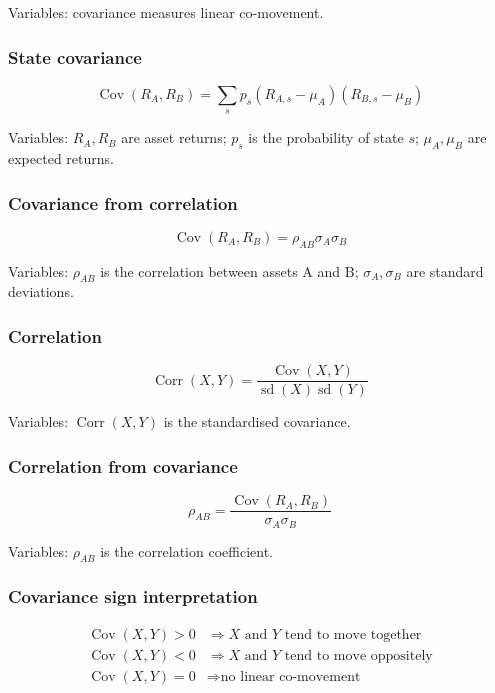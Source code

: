 \documentclass[
  8pt,
  twocolumn]{extarticle}
\begin{document}
Variables: covariance measures linear co-movement.

\subsubsection{State covariance}\label{state-covariance}

\[
\operatorname{Cov}(R_A,R_B)=\sum_s p_s(R_{A,s}-\mu_A)(R_{B,s}-\mu_B)
\]

Variables: \(R_A,R_B\) are asset returns; \(p_s\) is the probability of
state \(s\); \(\mu_A,\mu_B\) are expected returns.

\subsubsection{Covariance from
correlation}\label{covariance-from-correlation}

\[
\operatorname{Cov}(R_A,R_B)=\rho_{AB}\sigma_A\sigma_B
\]

Variables: \(\rho_{AB}\) is the correlation between assets A and B;
\(\sigma_A,\sigma_B\) are standard deviations.

\subsubsection{Correlation}\label{correlation}

\[
\operatorname{Corr}(X,Y)=\frac{\operatorname{Cov}(X,Y)}{\operatorname{sd}(X)\operatorname{sd}(Y)}
\]

Variables: \(\operatorname{Corr}(X,Y)\) is the standardised covariance.

\subsubsection{Correlation from
covariance}\label{correlation-from-covariance}

\[
\rho_{AB}=\frac{\operatorname{Cov}(R_A,R_B)}{\sigma_A\sigma_B}
\]

Variables: \(\rho_{AB}\) is the correlation coefficient.

\subsubsection{Covariance sign
interpretation}\label{covariance-sign-interpretation}

\[
\begin{aligned}
\operatorname{Cov}(X,Y)>0&\Rightarrow X\text{ and }Y\text{ tend to move together}\\
\operatorname{Cov}(X,Y)<0&\Rightarrow X\text{ and }Y\text{ tend to move oppositely}\\
\operatorname{Cov}(X,Y)=0&\Rightarrow \text{no linear co-movement}
\end{aligned}
\]
\end{document}
